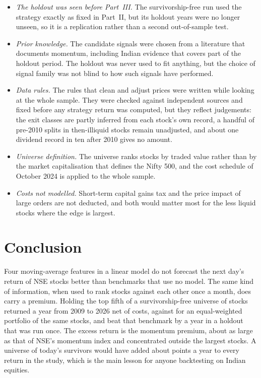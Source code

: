 \documentclass[11pt]{article}
\begin{document}
\begin{itemize}
\item \textit{The holdout was seen before Part~III.} The survivorship-free run used
  the strategy exactly as fixed in Part~II, but its holdout years were no longer
  unseen, so it is a replication rather than a second out-of-sample test.
\item \textit{Prior knowledge.} The candidate signals were chosen from a literature
  that documents momentum, including Indian evidence that covers part of the holdout
  period. The holdout was never used to fit anything, but the choice of signal family
  was not blind to how such signals have performed.
\item \textit{Data rules.} The rules that clean and adjust prices were written while
  looking at the whole sample. They were checked against independent sources and
  fixed before any strategy return was computed, but they reflect judgements: the
  exit classes are partly inferred from each stock's own record, a handful of
  pre-2010 splits in then-illiquid stocks remain unadjusted, and about one dividend
  record in ten after 2010 gives no amount.
\item \textit{Universe definition.} The universe ranks stocks by traded value rather
  than by the market capitalisation that defines the Nifty 500, and the cost schedule
  of October 2024 is applied to the whole sample.
\item \textit{Costs not modelled.} Short-term capital gains tax and the price impact
  of large orders are not deducted, and both would matter most for the less liquid
  stocks where the edge is largest.

\end{itemize}

\section{Conclusion}\label{sec:conclusion}

Four moving-average features in a linear model do not forecast the next day's
return of \NStocks{} NSE stocks better than benchmarks that use no model. The same
kind of information, when used to rank stocks against each other once a month, does
carry a premium. Holding the top fifth of a survivorship-free universe of
\PitUniverse{} stocks returned \PitCagrFull{} a year from 2009 to 2026 net of costs,
against \PitEwCagrFull{} for an equal-weighted portfolio of the same stocks, and beat
that benchmark by \PitActiveHold{} a year in a holdout that was run once. The excess
return is the momentum premium, about as large as that of NSE's momentum index and
concentrated outside the largest stocks. A universe of today's survivors would have
added about \BiasRounded{} points a year to every return in the study, which is the
main lesson for anyone backtesting on Indian equities.
\end{document}
